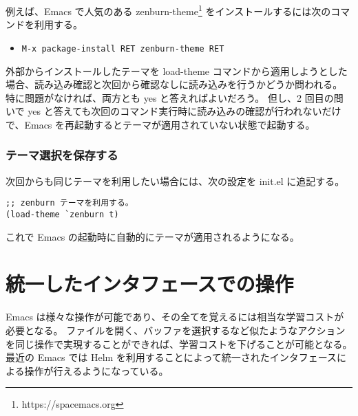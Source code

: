 例えば、Emacs で人気のある zenburn-theme\footnote{https://spacemacs.org} をインストールするには次のコマンドを利用する。
\begin{itemize}\setlength{\leftskip}{-1.00zw}%
\item[] \texttt{M-x package-install RET zenburn-theme RET}
\end{itemize}
外部からインストールしたテーマを load-theme コマンドから適用しようとした場合、読み込み確認と次回から確認なしに読み込みを行うかどうか問われる。
特に問題がなければ、両方とも yes と答えればよいだろう。
但し、2 回目の問いで yes と答えても次回のコマンド実行時に読み込みの確認が行われないだけで、Emacs を再起動するとテーマが適用されていない状態で起動する。
\subsubsection{テーマ選択を保存する}
次回からも同じテーマを利用したい場合には、次の設定を init.el に追記する。
\begin{mdframed}[roundcorner=0.50zw,leftmargin=3.00zw,rightmargin=3.00zw,skipabove=0.40zw,skipbelow=0.40zw,innertopmargin=4.00pt,innerbottommargin=4.00pt,innerleftmargin=5.00pt,innerrightmargin=5.00pt,linecolor=gray!020,linewidth=0.50pt,backgroundcolor=gray!20]
\begin{verbatim}
;; zenburn テーマを利用する。
(load-theme `zenburn t)
\end{verbatim}
\end{mdframed}
これで Emacs の起動時に自動的にテーマが適用されるようになる。
\section{統一したインタフェースでの操作}
Emacs は様々な操作が可能であり、その全てを覚えるには相当な学習コストが必要となる。\enlargethispage{1.60zw}
ファイルを開く、バッファを選択するなど似たようなアクションを同じ操作で実現することができれば、学習コストを下げることが可能となる。
最近の Emacs では Helm を利用することによって統一されたインタフェースによる操作が行えるようになっている。
